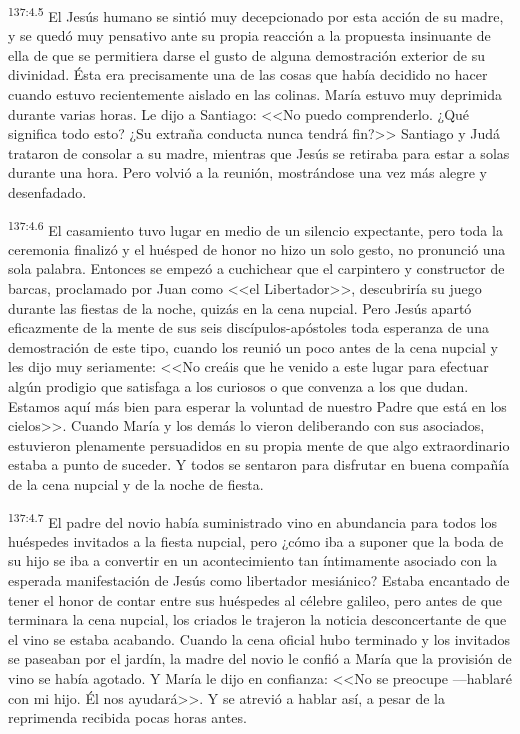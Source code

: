\par 
\textsuperscript{137:4.5} El Jesús humano se sintió muy decepcionado por esta acción de su madre, y se quedó muy pensativo ante su propia reacción a la propuesta insinuante de ella de que se permitiera darse el gusto de alguna demostración exterior de su divinidad. Ésta era precisamente una de las cosas que había decidido no hacer cuando estuvo recientemente aislado en las colinas. María estuvo muy deprimida durante varias horas. Le dijo a Santiago: <<No puedo comprenderlo. ¿Qué significa todo esto? ¿Su extraña conducta nunca tendrá fin?>> Santiago y Judá trataron de consolar a su madre, mientras que Jesús se retiraba para estar a solas durante una hora. Pero volvió a la reunión, mostrándose una vez más alegre y desenfadado.

\par 
\textsuperscript{137:4.6} El casamiento tuvo lugar en medio de un silencio expectante, pero toda la ceremonia finalizó y el huésped de honor no hizo un solo gesto, no pronunció una sola palabra. Entonces se empezó a cuchichear que el carpintero y constructor de barcas, proclamado por Juan como <<el Libertador>>, descubriría su juego durante las fiestas de la noche, quizás en la cena nupcial. Pero Jesús apartó eficazmente de la mente de sus seis discípulos-apóstoles toda esperanza de una demostración de este tipo, cuando los reunió un poco antes de la cena nupcial y les dijo muy seriamente: <<No creáis que he venido a este lugar para efectuar algún prodigio que satisfaga a los curiosos o que convenza a los que dudan. Estamos aquí más bien para esperar la voluntad de nuestro Padre que está en los cielos>>. Cuando María y los demás lo vieron deliberando con sus asociados, estuvieron plenamente persuadidos en su propia mente de que algo extraordinario estaba a punto de suceder. Y todos se sentaron para disfrutar en buena compañía de la cena nupcial y de la noche de fiesta.

\par 
\textsuperscript{137:4.7} El padre del novio había suministrado vino en abundancia para todos los huéspedes invitados a la fiesta nupcial, pero ¿cómo iba a suponer que la boda de su hijo se iba a convertir en un acontecimiento tan íntimamente asociado con la esperada manifestación de Jesús como libertador mesiánico? Estaba encantado de tener el honor de contar entre sus huéspedes al célebre galileo, pero antes de que terminara la cena nupcial, los criados le trajeron la noticia desconcertante de que el vino se estaba acabando. Cuando la cena oficial hubo terminado y los invitados se paseaban por el jardín, la madre del novio le confió a María que la provisión de vino se había agotado. Y María le dijo en confianza: <<No se preocupe ---hablaré con mi hijo. Él nos ayudará>>. Y se atrevió a hablar así, a pesar de la reprimenda recibida pocas horas antes.

